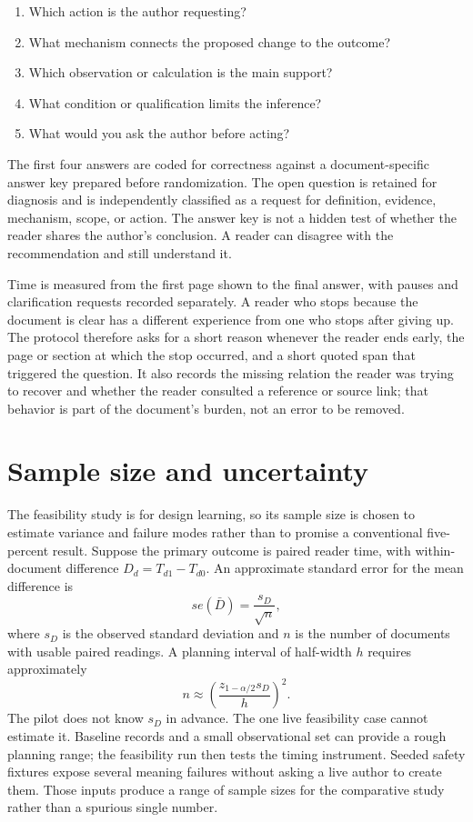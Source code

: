 \begin{enumerate}
\item Which action is the author requesting?
\item What mechanism connects the proposed change to the outcome?
\item Which observation or calculation is the main support?
\item What condition or qualification limits the inference?
\item What would you ask the author before acting?
\end{enumerate}

The first four answers are coded for correctness against a document-specific
answer key prepared before randomization. The open question is retained for
diagnosis and is independently classified as a request for definition,
evidence, mechanism, scope, or action. The answer key is not a hidden test of
whether the reader shares the author's conclusion. A reader can disagree with
the recommendation and still understand it.

Time is measured from the first page shown to the final answer, with pauses and
clarification requests recorded separately. A reader who stops because the
document is clear has a different experience from one who stops after giving
up. The protocol therefore asks for a short reason whenever the reader ends
early, the page or section at which the stop occurred, and a short quoted span
that triggered the question. It also records the missing relation the reader
was trying to recover and whether the reader consulted a reference or source link;
that behavior is part of the document's burden, not an error to be removed.

\section{Sample size and uncertainty}
\label{sec:eval-size}

The feasibility study is for design learning, so its sample size is chosen to
estimate variance and failure modes rather than to promise a conventional
five-percent result. Suppose the primary outcome is paired reader time, with
within-document difference $D_d=T_{d1}-T_{d0}$. An approximate standard error
for the mean difference is
\begin{equation}
  se(\bar D)=\frac{s_D}{\sqrt{n}},
  \label{eq:eval-se}
\end{equation}
where $s_D$ is the observed standard deviation and $n$ is the number of
documents with usable paired readings. A planning interval of half-width $h$
requires approximately
\begin{equation}
  n \approx \left(\frac{z_{1-\alpha/2}s_D}{h}\right)^2.
  \label{eq:eval-n}
\end{equation}
The pilot does not know $s_D$ in advance. The one live feasibility case cannot
estimate it. Baseline records and a small observational set can provide a rough
planning range; the feasibility run then tests the timing instrument. Seeded
safety fixtures expose several meaning failures without asking a live author to
create them. Those inputs produce a range of sample sizes for the comparative
study rather than a spurious single number.

